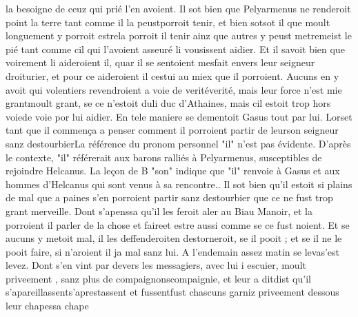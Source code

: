 \documentclass{article}
\begin{document}
\begin{pages}
               la besoigne de ceuz qui prié l’en avoient. Il sot bien que Pelyarmenus ne renderoit point la terre tant comme il
               la 
                  peustporroit tenir, et bien 
                  sotsot il que moult longuement 
                  y porroit estrela porroit il tenir ainz que autres y 
                  peust metremeist le pié tant comme cil qui l’avoient asseuré li vousissent aidier. Et il savoit
               bien que voirement li aideroient il, quar il se sentoient mesfait envers leur seigneur droiturier, et pour ce aideroient il
                  cestui au miex que il porroient. Aucuns en
               y avoit qui volentiers revendroient a 
                  voie de veritéverité, mais leur force n’est mie 
                  grantmoult grant, se ce n’estoit 
                  duli
               duc d’Athaines, mais cil estoit trop hors 
                  voiede voie por lui aidier. \pend
            \pstart En tele maniere se dementoit Gasus tout par lui. 
                  Lorset tant que il commença a penser comment il porroient
                  partir de 
                        leurson seigneur sanz destourbierLa
                  référence du pronom personnel "il" n'est pas évidente. D'après le contexte, "il"
                  référerait aux barons ralliés à Pelyarmenus, susceptibles de rejoindre Helcanus.
                  La leçon de B "son" indique que "il" renvoie à Gasus et aux hommes d'Helcanus qui
                  sont venus à sa rencontre.. Il sot bien qu’il estoit si plains de mal que a
               paines s’en porroient partir sanz destourbier que ce ne fust trop grant merveille.
               Dont s’apenssa qu’il les feroit aler au Biau Manoir, et la porroient il parler 
                     de la chose et faireet estre aussi comme se ce fust noient. Et se aucuns y metoit mal, il les 
                     deffenderoiten destorneroit, se il pooit ; et se il ne le pooit faire, si n’aroient il ja
                  mal sanz lui. A l’endemain assez matin 
                  se levas'est levez. Dont s’en vint 
                  par devers les messagiers, avec lui i escuier, moult priveement , sanz plus de 
                  compaignonscompaignie, et leur 
                  a ditdist qu’il 
                     s’apareillassents'aprestassent et 
                     fussentfust chascuns garniz priveement dessous 
                     leur chapessa chape
                  

\end{pages}
\end{document}
